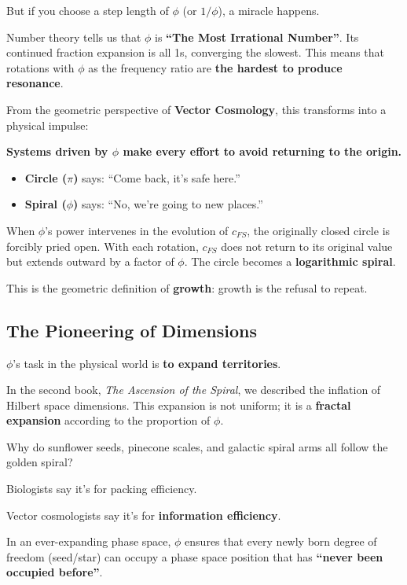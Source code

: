 But if you choose a step length of \textbf{$\phi$} (or $1/\phi$), a miracle happens.

Number theory tells us that $\phi$ is \textbf{``The Most Irrational Number''}. Its continued fraction expansion is all 1s, converging the slowest. This means that rotations with $\phi$ as the frequency ratio are \textbf{the hardest to produce resonance}.

From the geometric perspective of \textbf{Vector Cosmology}, this transforms into a physical impulse:

\textbf{Systems driven by $\phi$ make every effort to avoid returning to the origin.}

\begin{itemize}
\item \textbf{Circle ($\pi$)} says: ``Come back, it's safe here.''

\item \textbf{Spiral ($\phi$)} says: ``No, we're going to new places.''
\end{itemize}

When $\phi$'s power intervenes in the evolution of $c_{FS}$, the originally closed circle is forcibly pried open. With each rotation, $c_{FS}$ does not return to its original value but extends outward by a factor of $\phi$. The circle becomes a \textbf{logarithmic spiral}.

This is the geometric definition of \textbf{growth}: growth is the refusal to repeat.

\subsection{The Pioneering of Dimensions}

$\phi$'s task in the physical world is \textbf{to expand territories}.

In the second book, \textit{The Ascension of the Spiral}, we described the inflation of Hilbert space dimensions. This expansion is not uniform; it is a \textbf{fractal expansion} according to the proportion of $\phi$.

Why do sunflower seeds, pinecone scales, and galactic spiral arms all follow the golden spiral?

Biologists say it's for packing efficiency.

Vector cosmologists say it's for \textbf{information efficiency}.

In an ever-expanding phase space, $\phi$ ensures that every newly born degree of freedom (seed/star) can occupy a phase space position that has \textbf{``never been occupied before''}.

